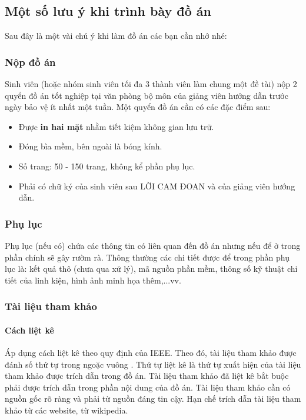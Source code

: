 \documentclass{article} %
\begin{document}
\subsection{Một số lưu ý khi trình bày đồ án}
Sau đây là một vài chú ý khi làm đồ án các bạn cần nhớ nhé:
\subsubsection{Nộp đồ án}
Sinh viên (hoặc nhóm sinh viên tối đa 3 thành viên làm chung một đề tài) nộp 2 quyển đồ án tốt nghiệp tại văn phòng bộ môn của giảng viên hướng dẫn trước ngày bảo vệ ít nhất một tuần. Một quyển đồ án cần có các đặc điểm sau:
\begin{itemize}
    \item Được \textbf{in hai mặt} nhằm tiết kiệm không gian lưu trữ.
    \item Đóng bìa mềm, bên ngoài là bóng kính.
    \item Số trang: 50 - 150 trang, không kể phần phụ lục.
    \item Phải có chữ ký của sinh viên sau LỜI CAM ĐOAN và của giảng viên hướng dẫn.
\end{itemize}
\subsubsection{Phụ lục}
Phụ lục (nếu có) chứa các thông tin có liên quan đến đồ án nhưng nếu để ở trong phần chính sẽ gây rườm rà. Thông thường các chi tiết được để trong phần phụ lục là: kết quả thô (chưa qua xử lý), mã nguồn phần mềm, thông số kỹ thuật chi tiết của linh kiện, hình ảnh minh họa thêm,...vv.

\subsubsection{Tài liệu tham khảo}
\paragraph{Cách liệt kê}\mbox{}

Áp dụng cách liệt kê theo quy định của IEEE. Theo đó, tài liệu tham khảo được đánh số thứ tự trong ngoặc vuông \cite{nguyen2018optimal}. Thứ tự liệt kê là thứ tự xuất hiện của tài liệu tham khảo được trích dẫn trong đồ án. Tài liệu tham khảo đã liệt kê bắt buộc phải được trích dẫn trong phần nội dung của đồ án. Tài liệu tham khảo cần có nguồn gốc rõ ràng và phải từ nguồn đáng tin cậy. Hạn chế trích dẫn tài liệu tham khảo từ các website, từ wikipedia.
\end{document}
